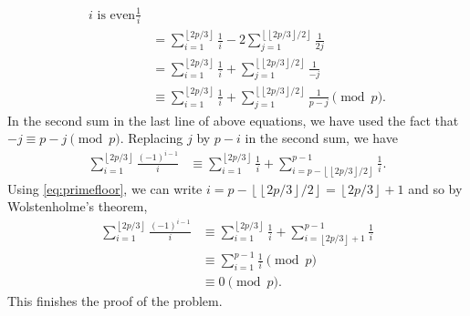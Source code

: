 \documentclass{subfile}
\begin{document}
\begin{solution}
\begin{align*}
{{				i\text{ is even}}}\frac {1}{i}\\
		&= \sum_{i = 1}^{\left\lfloor 2p/3\right\rfloor}\frac {1}{i} - 2\sum_{j = 1}^{\left\lfloor \left\lfloor 2p/3\right\rfloor /2\right\rfloor}\frac {1}{2j} \\
		&= \sum_{i = 1}^{\left\lfloor 2p/3\right\rfloor}\frac {1}{i} + \sum_{j = 1}^{\left\lfloor \left\lfloor 2p/3\right\rfloor /2\right\rfloor}\frac {1}{ - j}\\
		&\equiv\sum_{i = 1}^{\left\lfloor 2p/3\right\rfloor}\frac {1}{i} + \sum_{j = 1}^{\left\lfloor \left\lfloor 2p/3\right\rfloor /2\right\rfloor}\frac {1}{p - j} \pmod p.
		\end{align*}
		In the second sum in the last line of above equations, we have used the fact that $-j \equiv p-j \pmod p$. Replacing $ j$ by $ p - i$ in the second sum, we have
		\begin{align*}
		\sum_{i = 1}^{\left\lfloor 2p/3\right\rfloor}\frac {\left( - 1\right)^{i - 1}}{i} &\equiv \sum_{i = 1}^{\left\lfloor 2p/3\right\rfloor}\frac {1}{i} + \sum_{i = p - \left\lfloor \left\lfloor 2p/3\right\rfloor /2\right\rfloor}^{p - 1}\frac {1}{i}.
		\end{align*}
		Using \eqref{eq:primefloor}, we can write $i = p - \left\lfloor \left\lfloor 2p/3\right\rfloor /2\right\rfloor = \left\lfloor 2p/3\right\rfloor + 1$ and so by Wolstenholme's theorem,
		\begin{align*}
		\sum_{i = 1}^{\left\lfloor 2p/3\right\rfloor}\frac {\left( - 1\right)^{i - 1}}{i}  &\equiv \sum_{i = 1}^{\left\lfloor 2p/3\right\rfloor}\frac {1}{i} + \sum_{i = \left\lfloor 2p/3\right\rfloor + 1}^{p - 1}\frac {1}{i}\\
		&\equiv \sum_{i = 1}^{p - 1}\frac {1}{i}\pmod p\\
		&\equiv 0 \pmod p.
		\end{align*}
		This finishes the proof of the problem.
	\end{solution}
\end{document}

